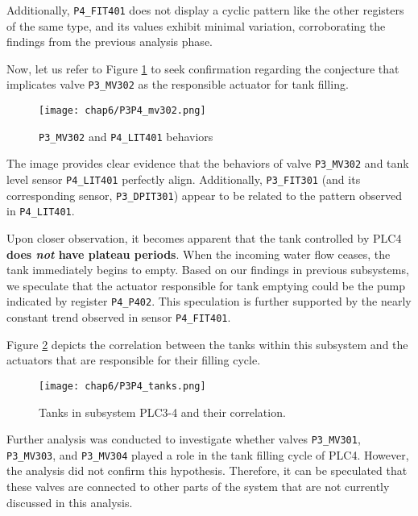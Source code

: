 Additionally, \texttt{P4\_FIT401} does not display a cyclic pattern like the other registers of the same type, and its values exhibit minimal variation, corroborating the findings from the previous analysis phase.

\bigskip
Now, let us refer to Figure \ref{fig:6_graph_P3P4_mv302} to seek confirmation regarding the conjecture that implicates valve \texttt{P3\_MV302} as the responsible actuator for tank filling.

\begin{figure}[ht]
	\centering
	\texttt{[image: chap6/P3P4\_mv302.png]}
	\caption{\texttt{P3\_MV302} and \texttt{P4\_LIT401} behaviors}
	\label{fig:6_graph_P3P4_mv302}
\end{figure}

The image provides clear evidence that the behaviors of valve \texttt{P3\_MV302} and tank level sensor \texttt{P4\_LIT401} perfectly align. Additionally, \texttt{P3\_FIT301} (and its corresponding sensor, \texttt{P3\_DPIT301}) appear to be related to the pattern observed in \texttt{P4\_LIT401}.
 
\bigskip
Upon closer observation, it becomes apparent that the tank controlled by PLC4 \textbf{does \textit{not} have plateau periods}. When the incoming water flow ceases, the tank immediately begins to empty. Based on our findings in previous subsystems, we speculate that the actuator responsible for tank emptying could be the pump indicated by register \texttt{P4\_P402}. This speculation is further supported by the nearly constant trend observed in sensor \texttt{P4\_FIT401}.

\bigskip
Figure \ref{fig:6_graph_P3P4_tanks} depicts the correlation between the tanks within this subsystem and the actuators that are responsible for their filling cycle.

\begin{figure}[ht]
	\centering
	\texttt{[image: chap6/P3P4\_tanks.png]}
	\caption{Tanks in subsystem PLC3-4 and their correlation.}
	\label{fig:6_graph_P3P4_tanks}
\end{figure}

\bigskip
Further analysis was conducted to investigate whether valves \texttt{P3\_MV301}, \texttt{P3\_MV303}, and \texttt{P3\_MV304} played a role in the tank filling cycle of PLC4. However, the analysis did not confirm this hypothesis. Therefore, it can be speculated that these valves are connected to other parts of the system that are not currently discussed in this analysis.

